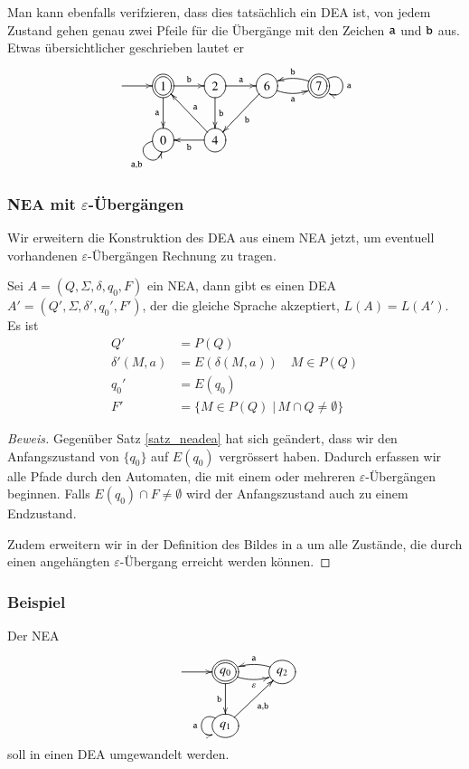 Man kann ebenfalls verifzieren, dass dies tatsächlich ein DEA ist, 
von jedem Zustand gehen genau zwei Pfeile für die Übergänge mit
den Zeichen ${\tt a}$ und ${\tt b}$ aus.
Etwas übersichtlicher geschrieben lautet er
\[
\entrymodifiers={++[o][F]}
\xymatrix{
*+\txt{}\ar[r]
	&*++[o][F=]{1}\ar[r]^{\tt b} \ar[d]_{\tt a}
		&2 \ar[r]^{\tt a} \ar[d]^{\tt b}
			&6\ar@/_/[r]_{\tt a} \ar[dl]^{\tt b}
				&*++[o][F=]{7}\ar@/_/[l]_{\tt b} \ar@(ur,dr)^{\tt a}
\\
*+\txt{}
	&0 \ar@(l,d)_{{\tt a},{\tt b}}
		&4 \ar[ul]_{\tt a} \ar[l]^{\tt b}
}
\]

\subsubsection{NEA mit $\varepsilon$-Übergängen}
Wir erweitern die Konstruktion des DEA aus einem NEA jetzt, um eventuell
vorhandenen $\varepsilon$-Übergängen Rechnung zu tragen.

\begin{satz}
\label{satz_neadea}
Sei $A=(Q,\Sigma,\delta,q_0,F)$ ein NEA, dann gibt es einen
DEA $A'=(Q',\Sigma,\delta',q_0',F')$, der die gleiche Sprache
akzeptiert, $L(A)=L(A')$.
Es ist
\begin{align*}
Q'&=P(Q)\\
\delta'(M,a)&=E(\delta(M, a))\quad M\in P(Q)\\
q_0'&=E(q_0)\\
F'&=\{M\in P(Q)\;|\, M\cap Q\ne \emptyset\}
\end{align*}
\end{satz}

\begin{proof}[Beweis]
Gegenüber Satz \ref{satz_neadea} hat sich geändert, dass wir den
Anfangszustand von $\{q_0\}$ auf $E(q_0)$ vergrössert haben.
Dadurch erfassen wir alle Pfade durch den Automaten, die mit einem oder
mehreren $\varepsilon$-Übergängen beginnen.
Falls $E(q_0)\cap F\ne \emptyset$
wird der Anfangszustand auch zu einem Endzustand.

Zudem erweitern wir in der Definition des Bildes in a um alle Zustände,
die durch einen angehängten $\varepsilon$-Übergang erreicht werden
können.
\end{proof}

\subsubsection{Beispiel}
Der NEA 
\[
\entrymodifiers={++[o][F]}
\xymatrix{
*+\txt{}\ar[r]
	&*++[o][F=]{q_0} \ar[d]_{\tt b} \ar@/_/[r]_{\varepsilon}
		&{q_2}\ar@/_/[l]_{\tt a}
\\
*+\txt{}
	&{q_1}\ar[ur]_{{\tt a},{\tt b}} \ar@(ul,dl)_{\tt a}
}
\]
soll in einen DEA umgewandelt werden.

